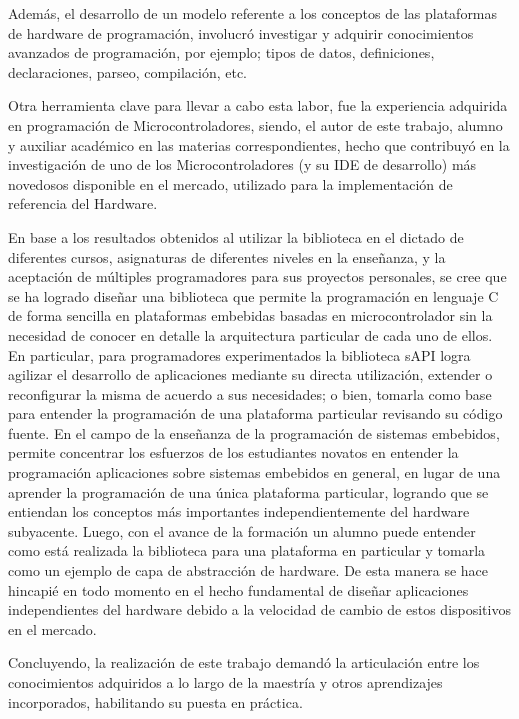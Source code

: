 Además, el desarrollo de un modelo referente a los conceptos de las plataformas de hardware  de programación, involucró investigar y adquirir conocimientos avanzados de programación, por ejemplo; tipos de datos, definiciones, declaraciones, parseo, compilación, etc.

Otra herramienta clave para llevar a cabo esta labor, fue la experiencia adquirida en programación de Microcontroladores,  siendo, el autor de este trabajo, alumno y auxiliar académico en las materias correspondientes, hecho que contribuyó en la investigación de uno de los Microcontroladores (y su IDE de desarrollo) más novedosos disponible en el mercado, utilizado para la implementación de referencia del Hardware.




En base a los resultados obtenidos al utilizar la biblioteca en el dictado de diferentes cursos, asignaturas de diferentes niveles en la enseñanza, y la aceptación de múltiples programadores para sus proyectos personales, se cree que se ha logrado diseñar una biblioteca que permite la programación en lenguaje C de forma sencilla en plataformas embebidas basadas en microcontrolador sin la necesidad de conocer en detalle la arquitectura particular de cada uno de ellos. En particular, para programadores experimentados la biblioteca sAPI logra agilizar el desarrollo de aplicaciones mediante su directa utilización, extender o reconfigurar la misma de acuerdo a sus necesidades; o bien, tomarla como base para entender la programación de una plataforma particular revisando su código fuente. En el campo de la enseñanza de la programación de sistemas embebidos, permite concentrar los esfuerzos de los estudiantes novatos en entender la programación aplicaciones sobre sistemas embebidos en general, en lugar de una aprender la programación de una única plataforma particular, logrando que se entiendan los conceptos más importantes independientemente del hardware subyacente. Luego, con el avance de la formación un alumno puede entender como está realizada la biblioteca para una plataforma en particular y tomarla como un ejemplo de capa de abstracción de hardware. De esta manera se hace hincapié en todo momento en el hecho fundamental de diseñar aplicaciones independientes del hardware debido a la velocidad de cambio de estos dispositivos en el mercado.


Concluyendo, la realización de este trabajo demandó la articulación entre los conocimientos adquiridos a lo largo de la maestría y otros aprendizajes incorporados, habilitando su puesta en práctica.

